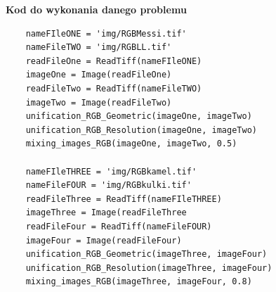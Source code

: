 \documentclass[magisterska,openany]{pracadypl}
\begin{document}
\vspace{0.5cm}
\textbf{\Large Kod do wykonania danego problemu}
\lstset{language=Python}
\vspace{0.25cm}
\begin{lstlisting}
	nameFIleONE = 'img/RGBMessi.tif'
	nameFileTWO = 'img/RGBLL.tif'
	readFileOne = ReadTiff(nameFIleONE)
	imageOne = Image(readFileOne)
	readFileTwo = ReadTiff(nameFileTWO)
	imageTwo = Image(readFileTwo)
	unification_RGB_Geometric(imageOne, imageTwo)
	unification_RGB_Resolution(imageOne, imageTwo)
	mixing_images_RGB(imageOne, imageTwo, 0.5)
	
	nameFIleTHREE = 'img/RGBkamel.tif'
	nameFileFOUR = 'img/RGBkulki.tif'
	readFileThree = ReadTiff(nameFIleTHREE)
	imageThree = Image(readFileThree
	readFileFour = ReadTiff(nameFileFOUR)
	imageFour = Image(readFileFour)
	unification_RGB_Geometric(imageThree, imageFour)
	unification_RGB_Resolution(imageThree, imageFour)
	mixing_images_RGB(imageThree, imageFour, 0.8)

\end{lstlisting}
\end{document}
